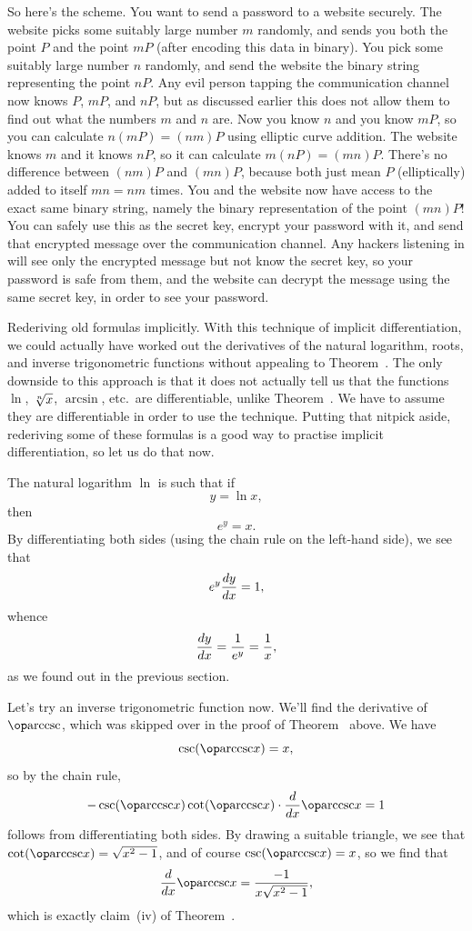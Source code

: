 So here's the scheme. You want to send a password to a website securely. The website picks some suitably
large number $m$ randomly, and sends you both the point $P$ and the point $mP$ (after encoding this data
in binary).
You pick some suitably
large number $n$ randomly, and send the website the binary string representing the
point $nP$. Any evil person tapping the communication
channel now knows $P$, $mP$, and $nP$, but as discussed earlier
this does not allow them to find out what the numbers
$m$ and $n$ are.
Now you know $n$ and you know $mP$, so you can calculate $n(mP) = (nm)P$ using elliptic curve addition.
The website knows $m$ and it knows $nP$, so it can calculate $m(nP) = (mn)P$. There's no difference
between $(nm)P$ and $(mn)P$, because both just mean $P$ (elliptically) added to itself $mn = nm$ times.
You and the website now have access to the exact same binary string, namely the binary representation
of the point $(mn)P$! You can safely use this as the secret key, encrypt your password with it, and send
that encrypted message over the communication channel. Any hackers listening in will see only the encrypted
message but not know the secret key, so your password is safe from them, and the website can decrypt
the message using the same secret key, in order to see your password.


\medskip\boldlabel Rederiving old formulas implicitly.
With this technique of implicit differentiation, we could actually have worked out the derivatives of
the natural logarithm, roots, and inverse trigonometric functions without appealing to
Theorem~{\thmderivinverse}. The only downside to this approach is that it does not actually tell us that the
functions $\ln$, $\root n\of x$, $\arcsin$, etc.~are differentiable, unlike Theorem~{\thmderivinverse}.
We have to assume they are differentiable in order to use the technique. Putting that nitpick aside,
rederiving some of these formulas is a good way to practise implicit differentiation, so let us do that now.

The natural logarithm $\ln$ is such that if
$$y=\ln x,$$
then
$$e^y = x.$$
By differentiating both sides (using the chain rule on the left-hand side),
we see that
$$e^y{dy\over dx} = 1,$$
whence
$${dy\over dx} = {1\over e^y} = {1\over x},$$
as we found out in the previous section.

Let's try an inverse trigonometric function now. We'll find the derivative of $\arccsc$, which was skipped
over in the proof of Theorem~{\thminversetrig} above. We have
$$\csc(\arccsc x) = x,$$
so by the chain rule,
$$-\csc(\arccsc x)\cot(\arccsc x)\cdot {d\over dx}\arccsc x = 1$$
follows from differentiating both sides. By drawing a suitable triangle, we see that
$\cot(\arccsc x) = \sqrt{x^2-1}$, and of course $\csc(\arccsc x) = x$, so we find that
$${d\over dx} \arccsc x = {-1\over x\sqrt{x^2-1}},$$
which is exactly claim~(iv) of Theorem~{\thminversetrig}.


